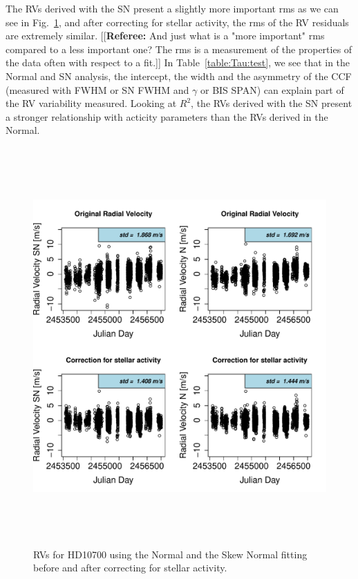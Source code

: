 \documentclass[11pt, oneside]{article}
\newcommand{\comment}[1]{{\color{red}[[\textbf{Referee: }#1]]}}
\begin{document}
The RVs derived with the SN present a slightly more important rms as we can see in Fig.~\ref{fig:Tau:correctionRV}, and after correcting for stellar activity, the rms of the RV residuals are extremely similar. 
\comment{And just what is a "more important" rms compared to a less important one? The rms is a measurement of the properties of the data often with respect to a fit.}
In Table~\ref{table:Tau:test}, we see that in the Normal and SN analysis, the intercept, the width and the asymmetry of the CCF (measured with FWHM or SN FWHM and $\gamma$ or BIS SPAN) can explain part of the RV variability measured. Looking at $R^2$, the RVs derived with the SN present a stronger relationship with acticity parameters than the RVs derived in the Normal.
%
\begin{figure}[htbp]
   \centering
\includegraphics[height = 6in]{HD10700_[3]CorrectionActivity_RadialVelocity_vs_time.pdf} 
   \caption{RVs for HD10700 using the Normal and the Skew Normal fitting before and after correcting for stellar activity.}
   \label{fig:Tau:correctionRV}
\end{figure}
%
\end{document}
